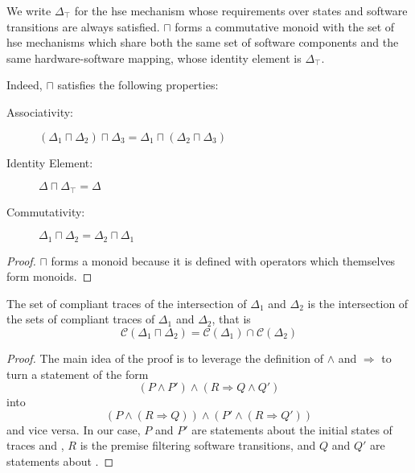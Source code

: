 \begin{lemma}
  We write $\Delta_\top$ for the \ac{hse} mechanism whose requirements over
  states and software transitions are always satisfied.
  \( \sqcap \) forms a commutative monoid with the set of \ac{hse} mechanisms
  which share both the same set of software components and the same
  hardware-software mapping, whose identity element is \( \Delta_\top \).

  Indeed, \( \sqcap \) satisfies the following properties:

  \begin{description}
  \item [Associativity:]
    \( (\Delta_1 \sqcap \Delta_2) \sqcap \Delta_3 = \Delta_1 \sqcap (\Delta_2
    \sqcap \Delta_3) \)
  \item [Identity Element:] \( \Delta \sqcap \Delta_\top = \Delta \)
  \item [Commutativity:]
    \( \Delta_1 \sqcap \Delta_2 = \Delta_2 \sqcap \Delta_1 \)
  \end{description}

  \begin{proof}
    \( \sqcap \) forms a monoid because it is defined with operators which
    themselves form monoids.
  \end{proof}
\end{lemma}

\begin{lemma}
  \label{lemma:speccert:compinter}
  The set of compliant traces of the intersection of $\Delta_1$ and $\Delta_2$
  is the intersection of the sets of compliant traces of $\Delta_1$ and
  $\Delta_2$, that is
  \[
    \mathcal{C}(\Delta_1 \sqcap \Delta_2) = \mathcal{C}(\Delta_1) \cap
    \mathcal{C}(\Delta_2)
  \]

  \begin{proof}
    The main idea of the proof is to leverage the definition of $\wedge$ and
    $\Rightarrow$ to turn a statement of the form
    \[
      (P \wedge P') \wedge (R \Rightarrow Q \wedge Q')
    \]
    into
    \[
      (P \wedge (R \Rightarrow Q)) \wedge (P' \wedge (R \Rightarrow Q'))
    \]
    and vice versa.
    In our case, $P$ and $P'$ are statements about the initial states of traces
    and , $R$ is the premise filtering software transitions,
    and $Q$ and $Q'$ are statements about .
  \end{proof}
\end{lemma}


